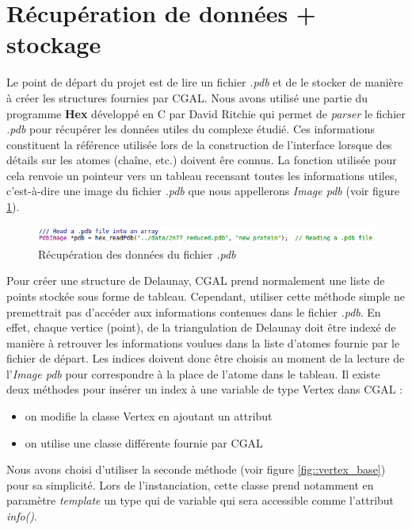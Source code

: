\section{Récupération de données + stockage}


Le point de départ du projet est de lire un fichier \textit{.pdb} et de le stocker
de manière à créer les structures fournies par CGAL. Nous avons utilisé une partie du programme
\textbf{Hex} développé en C par David Ritchie qui permet de \textit{parser} le fichier
\textit{.pdb} pour récupérer les données utiles du complexe étudié. Ces informations constituent
la référence utilisée lors de la construction de l'interface lorsque des détails
sur les atomes (chaîne, etc.) doivent êre connus. La fonction utilisée pour cela
renvoie un pointeur vers un tableau recensant toutes les informations utiles, c'est-à-dire
une image du fichier \textit{.pdb} que nous appellerons \textit{Image pdb} (voir
figure \ref{fig::read_pdb}).

\begin{figure}[ht]
\centering
  \includegraphics[width=\textwidth]{figures/pdb_image.png}
  \caption{Récupération des données du fichier \textit{.pdb}}
  \label{fig::read_pdb}
\end{figure}

Pour créer une structure de Delaunay, CGAL prend normalement une liste de points stockée
sous forme de tableau. Cependant, utiliser cette méthode simple ne premettrait pas d'accéder aux
informations contenues dans le fichier \textit{.pdb}. En effet, chaque vertice (point), de la
triangulation de Delaunay doit être indexé de manière à retrouver les informations voulues dans la
liste d'atomes fournie par le fichier de départ. Les indices doivent donc être choisis
au moment de la lecture de l'\textit{Image pdb} pour correspondre à la place de l'atome
dans le tableau.
Il existe deux méthodes pour insérer un index à une variable de type Vertex dans CGAL :
\begin{itemize}
  \item on modifie la classe Vertex en ajoutant un attribut
  \item on utilise une classe différente fournie par CGAL
\end{itemize}
Nous avons choisi d'utiliser la seconde méthode (voir figure \ref{fig::vertex_base}) pour
sa simplicité. Lors de l'instanciation, cette classe prend notamment en paramètre
\textit{template} un type qui de variable qui sera accessible comme l'attribut \textit{info()}.

